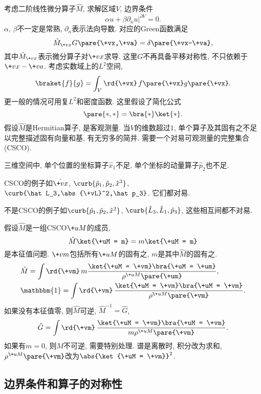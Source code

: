 \documentclass[hidelinks]{ctexart}
\begin{document}
\newpoint{}考虑二阶线性微分算子$\hat M$, 求解区域$V$, 边界条件
\[ \alpha u + \beta\partial_n u\vert^{\partial V} = 0. \]
$\alpha$, $\beta$不一定是常熟, $\partial_n$表示法向导数.
\newpoint{}对应的Green函数满足
\[ \hat M_{\+vx}G\pare{\+vx,\+va} = \delta\pare{\+vx-\+va}, \]
其中$\hat M_{\+vx}$表示微分算子对$\+vx$求导. 这里$G$不再具备平移对称性, 不只依赖于$\+vx-\+va$.
\newpoint{}考虑实数域上的$L^2$空间,
\[ \braket{f}{g} = \int_V \rd{\+vx}\,f\pare{\+vx}g\pare{\+vx}. \]
\newpoint{}更一般的情况可用复$L^2$和密度函数.
\newpoint{}这里假设了简化公式
\[ \pare{*,*} = \bra{*}\ket{*}. \]
\newpoint{}假设$\hat M$是Hermitian算子, 是客观测量.
\newpoint{}当$V$的维数超过$1$, 单个算子及其固有之不足以完整描述固有向量和基, 有无穷多的简并.
\newpoint{}需要一个对易可观测量的完整集合(CSCO).
\begin{ex}
    三维空间中, 单个位置的坐标算子$\hat x_1$不足, 单个坐标的动量算子$\hat p_2$也不足.
\end{ex}
\begin{ex}
    CSCO的例子如$\hat {\+vx}$, $\curb{\hat p_1,\hat p_2, \hat x^3}$, $\curb{\hat L_3,\abs{\+vL}^2,\hat p_3}$. 它们都对易.
\end{ex}
\begin{ex}
    不是CSCO的例子如$\curb{\hat p_1,\hat p_2,\hat x^2}$, $\curb{\hat L_3,\hat L_1,\hat p_3}$, 这些相互间都不对易.
\end{ex}
\newpoint{}假设$\hat M$是一组CSCO$\+uM$的成员,
\[ \hat M\ket{\+uM = m} = m\ket{\+uM = m} \]
是本征值问题. $\+vm$包括所有$\+uM$的固有之, $m$是其中$\hat M$的固有之.
\begin{align*}
    & \hat M = \int \rd{\+vm}\, m \frac{\ket{\+uM = \+vm}\bra{\+uM = \+um}}{\rho^{\+uM}\pare{\+um}}, \\
    & \mathbbm{1} = \int \rd{\+vm}\, \frac{\ket{\+uM = \+vm}\bra{\+uM = \+vm}}{\rho^{\+uM}\pare{\+vm}}.
\end{align*}
\newpoint{}如果没有本征值零, 则$\hat M$可逆, $\hat M^{-1} = \hat G$,
\[ \hat G = \int \rd{\+vm}\, \frac{\ket{\+uM = \+vm}\bra{\+uM = \+vm}}{m\rho^{\+uM}\pare{\+vm}}. \]
\newpoint{}如果有$m=0$, 则$M$不可逆, 需要特别处理.
\newpoint{}谱是离散时, 积分改为求和, $\rho^{\+uM}\pare{\+vm}$改为$\abs{\ket{\+uM = \+vm}}^2$.


\subsection{边界条件和算子的对称性} %
\label{sub:边界条件和算子的对称性}
\end{document}
